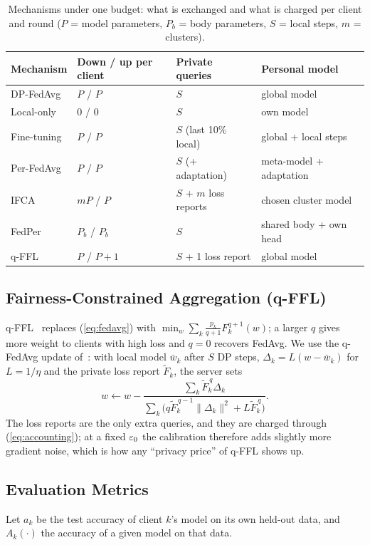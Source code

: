 \begin{table}[!t]
\caption{Mechanisms under one budget: what is exchanged and what is charged per client and round ($P$ = model
parameters, $P_b$ = body parameters, $S$ = local steps, $m$ = clusters).}
\label{tab:mechanisms}
\centering
\footnotesize
\begin{tabular}{p{1.45cm}p{1.75cm}p{1.6cm}p{2.2cm}}
\toprule
Mechanism & Down / up per client & Private queries & Personal model \\
\midrule
DP-FedAvg & $P$ / $P$ & $S$ & global model \\
Local-only & 0 / 0 & $S$ & own model \\
Fine-tuning & $P$ / $P$ & $S$ (last 10\% local) & global + local steps \\
Per-FedAvg & $P$ / $P$ & $S$ (+ adaptation) & meta-model + adaptation \\
IFCA & $mP$ / $P$ & $S$ + $m$ loss reports & chosen cluster model \\
FedPer & $P_b$ / $P_b$ & $S$ & shared body + own head \\
q-FFL & $P$ / $P{+}1$ & $S$ + 1 loss report & global model \\
\bottomrule
\end{tabular}
\end{table}

\subsection{Fairness-Constrained Aggregation (q-FFL)}
q-FFL~\cite{li2020fair} replaces (\ref{eq:fedavg}) with $\min_w\sum_k \frac{p_k}{q+1}F_k^{q+1}(w)$; a larger $q$ gives
more weight to clients with high loss and $q=0$ recovers FedAvg. We use the q-FedAvg update of~\cite{li2020fair}: with
local model $\bar w_k$ after $S$ DP steps, $\Delta_k=L(w-\bar w_k)$ for $L=1/\eta$ and the private loss report
$\tilde F_k$, the server sets
\begin{equation}
w \leftarrow w-\frac{\sum_k \tilde F_k^{\,q}\Delta_k}{\sum_k\big(q\tilde F_k^{\,q-1}\lVert\Delta_k\rVert^2+L\tilde F_k^{\,q}\big)}.
\label{eq:qffl}
\end{equation}
The loss reports are the only extra queries, and they are charged through (\ref{eq:accounting}); at a fixed $\varepsilon_0$
the calibration therefore adds slightly more gradient noise, which is how any ``privacy price'' of q-FFL shows up.

\subsection{Evaluation Metrics}
Let $a_k$ be the test accuracy of client $k$'s model on its own held-out data, and $A_k(\cdot)$ the accuracy of a
given model on that data.

